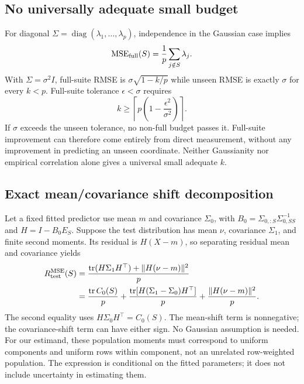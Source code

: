 \documentclass{article}
\newcommand{\tr}{\operatorname{tr}}
\newcommand{\MSE}{\operatorname{MSE}}
\begin{document}
\subsection{No universally adequate small budget}
\label{app:diagonal}
For diagonal $\Sigma=\operatorname{diag}(\lambda_1,\ldots,\lambda_p)$, independence in the Gaussian case implies
\begin{equation}
 \MSE_{\rm full}(S)=\frac1p\sum_{j\notin S}\lambda_j.
\end{equation}
With $\Sigma=\sigma^2 I$, full-suite RMSE is $\sigma\sqrt{1-k/p}$ while unseen RMSE is exactly $\sigma$ for every $k<p$. Full-suite tolerance $\epsilon<\sigma$ requires
\begin{equation}
 k\geq \left\lceil p\left(1-\frac{\epsilon^2}{\sigma^2}\right)\right\rceil.
\end{equation}
If $\sigma$ exceeds the unseen tolerance, no non-full budget passes it. Full-suite improvement can therefore come entirely from direct measurement, without any improvement in predicting an unseen coordinate. Neither Gaussianity nor empirical correlation alone gives a universal small adequate $k$.

\subsection{Exact mean/covariance shift decomposition}
\label{app:shift}
Let a fixed fitted predictor use mean $m$ and covariance $\Sigma_0$, with $B_0=\Sigma_{0,:S}\Sigma_{0,SS}^{-1}$ and $H=I-B_0E_S$. Suppose the test distribution has mean $\nu$, covariance $\Sigma_1$, and finite second moments. Its residual is $H(X-m)$, so separating residual mean and covariance yields
\begin{align}
 R_{\rm test}^{\rm MSE}(S)
 &=\frac{\tr(H\Sigma_1H^\top)+\|H(\nu-m)\|^2}{p}\\
 &=\frac{\tr C_0(S)}p
 +\frac{\tr[H(\Sigma_1-\Sigma_0)H^\top]}p
 +\frac{\|H(\nu-m)\|^2}p.
\end{align}
The second equality uses $H\Sigma_0H^\top=C_0(S)$. The mean-shift term is nonnegative; the covariance-shift term can have either sign. No Gaussian assumption is needed. For our estimand, these population moments must correspond to uniform components and uniform rows within component, not an unrelated row-weighted population. The expression is conditional on the fitted parameters; it does not include uncertainty in estimating them.
\end{document}
